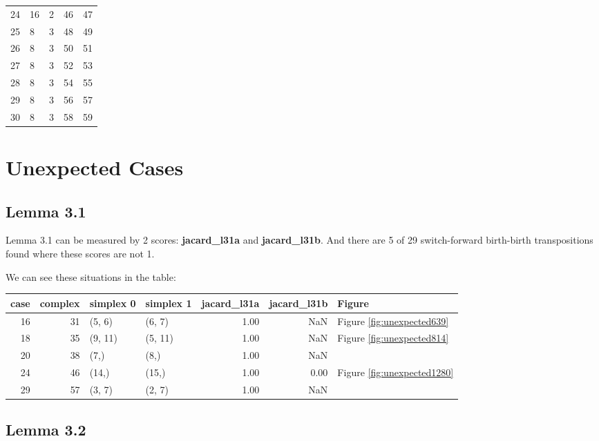 \documentclass{article}
\begin{document}
\begin{center}
\begin{tabular}{lllrr}
\cline{1-5} \cline{2-5}
24 & 16 & 2 & 46 & 47 \\
\cline{1-5} \cline{2-5}
25 & 8 & 3 & 48 & 49 \\
\cline{1-5} \cline{2-5}
26 & 8 & 3 & 50 & 51 \\
\cline{1-5} \cline{2-5}
27 & 8 & 3 & 52 & 53 \\
\cline{1-5} \cline{2-5}
28 & 8 & 3 & 54 & 55 \\
\cline{1-5} \cline{2-5}
29 & 8 & 3 & 56 & 57 \\
\cline{1-5} \cline{2-5}
30 & 8 & 3 & 58 & 59 \\
\cline{1-5} \cline{2-5}
\bottomrule
\end{tabular}

\end{center}


\section{Unexpected Cases}
\subsection{Lemma 3.1}

\par Lemma 3.1 can be measured by 2 scores: \textbf{jacard\_l31a} and \textbf{jacard\_l31b}.
And there are 5 of 29 switch-forward birth-birth transpositions found where these scores are not 1.
\par We can see these situations in the table:
\begin{center}\begin{tabular}{rrllrrl}
\toprule
case & complex & simplex 0 & simplex 1 & jacard\_l31a & jacard\_l31b & Figure \\
\midrule
16 & 31 & (5, 6) & (6, 7) & 1.00 & NaN & Figure \ref{fig:unexpected639} \\
18 & 35 & (9, 11) & (5, 11) & 1.00 & NaN & Figure \ref{fig:unexpected814} \\
20 & 38 & (7,) & (8,) & 1.00 & NaN &  \\
24 & 46 & (14,) & (15,) & 1.00 & 0.00 & Figure \ref{fig:unexpected1280} \\
29 & 57 & (3, 7) & (2, 7) & 1.00 & NaN &  \\
\bottomrule
\end{tabular}
\end{center}
\subsection{Lemma 3.2}
\end{document}
